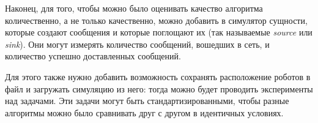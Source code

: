\documentclass[%
]{report}
\begin{document}
Наконец, для того, чтобы можно было оценивать качество алгоритма
количественно, а не только качественно,
можно добавить в симулятор
сущности,
которые создают сообщения
и которые поглощают их
(так называемые \emph{source} или \emph{sink}).
Они могут измерять количество сообщений,
вошедших в сеть,
и количество успешно доставленных сообщений.

Для этого также нужно добавить возможность сохранять расположение роботов
в файл и загружать симуляцию из него:
тогда можно будет проводить эксперименты
над задачами.
Эти задачи могут быть стандартизированными,
чтобы разные алгоритмы можно было сравнивать друг с другом
в идентичных условиях.








\end{document}
